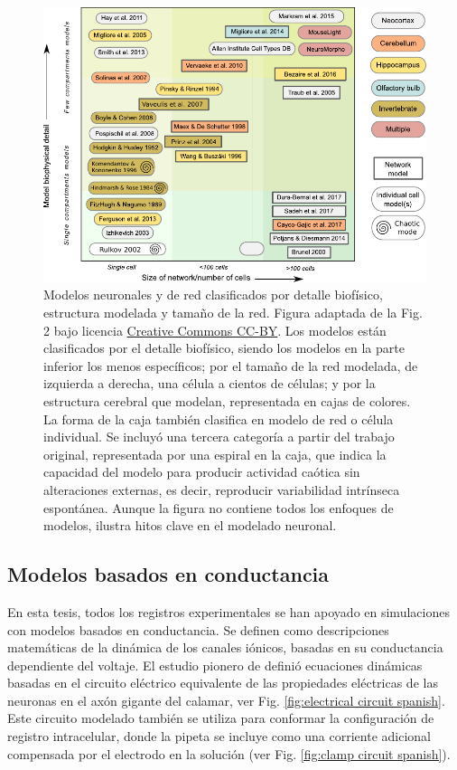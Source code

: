 \begin{figure}[bth!]
\centering
\includegraphics[width=\textwidth]{img/intro/models classification_v2.pdf}
\caption{Modelos neuronales y de red clasificados por detalle biofísico, estructura modelada y tamaño de la red. Figura adaptada de la Fig. 2 \parencite{gleeson_open_2019} bajo licencia \href{http://creativecommons.org/licenses/by/4.0/}{Creative Commons CC-BY}. Los modelos están clasificados por el detalle biofísico, siendo los modelos en la parte inferior los menos específicos; por el tamaño de la red modelada, de izquierda a derecha, una célula a cientos de células; y por la estructura cerebral que modelan, representada en cajas de colores. La forma de la caja también clasifica en modelo de red o célula individual. Se incluyó una tercera categoría a partir del trabajo original, representada por una espiral en la caja, que indica la capacidad del modelo para producir actividad caótica sin alteraciones externas, es decir, reproducir variabilidad intrínseca espontánea. Aunque la figura no contiene todos los enfoques de modelos, ilustra hitos clave en el modelado neuronal.}
\label{fig:models-classification spanish}
\end{figure}

\subsection{Modelos basados en conductancia}

En esta tesis, todos los registros experimentales se han apoyado en simulaciones con modelos basados en conductancia. Se definen como descripciones matemáticas de la dinámica de los canales iónicos, basadas en su conductancia dependiente del voltaje. El estudio pionero de \textcite{hodgkin_quantitative_1952} definió ecuaciones dinámicas basadas en el circuito eléctrico equivalente de las propiedades eléctricas de las neuronas en el axón gigante del calamar, ver Fig. \ref{fig:electrical circuit spanish}. Este circuito modelado también se utiliza para conformar la configuración de registro intracelular, donde la pipeta se incluye como una corriente adicional compensada por el electrodo en la solución (ver Fig. \ref{fig:clamp circuit spanish}).

